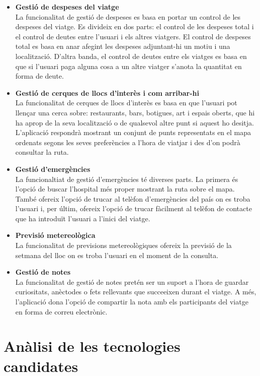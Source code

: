 \begin{itemize}

\item{}\textbf{Gestió de despeses del viatge}\\
La funcionalitat de gestió de despeses es basa en portar un control de les
despeses del viatge. Es divideix en dos parts: el control de les despeses
total i el control de deutes entre l’usuari i els altres viatgers. El control de despeses total es basa en anar afegint les despeses adjuntant-hi un motiu i una localització. D’altra banda, el control de deutes entre els viatges es basa en que si l’usuari paga alguna cosa a un altre viatger s’anota la quantitat en forma de deute.
\item{}\textbf{Gestió de cerques de llocs d’interès i com arribar-hi}\\
La funcionalitat de cerques de llocs d’interès es basa en que l’usuari pot llençar una cerca sobre: restaurants, bars, botigues, art i espais oberts, que hi ha aprop de la seva localització o de qualsevol altre punt si aquest ho desitja. \\
L’aplicació respondrà mostrant
un conjunt de punts representats en el mapa ordenats segons les seves
preferències a l’hora de viatjar i des d'on podrà consultar la ruta.
\item{}\textbf{Gestió d’emergències}\\
La funcionaltiat de gestió d’emergències té diverses parts. La primera és
l’opció de buscar l’hospital més proper mostrant la ruta sobre
el mapa. També ofereix l'opció de trucar al telèfon d'emergències del país on es troba l’usuari i, per últim, ofereix l’opció de trucar
fàcilment al telèfon de contacte que ha introduït l’usuari a l’inici del viatge.
\item{}\textbf{Previsió metereològica}\\
La funcionalitat de previsions metereològiques ofereix la previsió de la
setmana del lloc on es troba l'usuari en el moment de la consulta.
\item{}\textbf{Gestió de notes}\\
La funcionalitat de gestió de notes pretén ser un suport a l’hora de guardar curiositats, anèctodes o fets rellevants que succeeixen durant el viatge.
A més, l’aplicació dona l’opció de compartir la nota amb els participants del viatge en forma de correu electrònic.

\end{itemize}

\section{Anàlisi de les tecnologies candidates}

